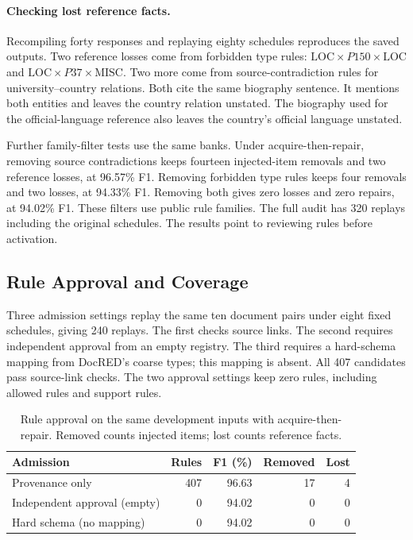 \paragraph{Checking lost reference facts.}

Recompiling forty responses and replaying eighty schedules reproduces
the saved outputs. Two reference losses come from forbidden type rules:
$\mathrm{LOC}\!\times\!P150\!\times\!\mathrm{LOC}$ and
$\mathrm{LOC}\!\times\!P37\!\times\!\mathrm{MISC}$.
Two more come from source-contradiction rules for university--country
relations. Both cite the same biography sentence. It mentions both
entities and leaves the country relation unstated.
The biography used for the official-language reference also leaves
the country's official language unstated.

Further family-filter tests use the same banks. Under acquire-then-repair,
removing source contradictions keeps fourteen injected-item removals
and two reference losses, at 96.57\% F1. Removing forbidden type rules
keeps four removals and two losses, at 94.33\% F1. Removing both gives
zero losses and zero repairs, at 94.02\% F1. These filters use public
rule families. The full audit has 320 replays including the original
schedules. The results point to reviewing rules before activation.

\subsection{Rule Approval and Coverage}

\label{app:rule_admission}

Three admission settings replay the same ten document pairs under eight
fixed schedules, giving 240 replays. The first checks source links.
The second requires independent approval from an empty registry.
The third requires a hard-schema mapping from DocRED's coarse types;
this mapping is absent. All 407 candidates pass source-link checks.
The two approval settings keep zero rules, including allowed rules
and support rules.

\begin{table}[t]
\centering
\caption{Rule approval on the same development inputs with acquire-then-repair. Removed counts injected items; lost counts reference facts.}
\label{tab:rule_admission_coverage}
\footnotesize
\setlength{\tabcolsep}{3pt}
\begin{tabular}{lrrrr}
\toprule
Admission & Rules & F1 (\%) & Removed & Lost \\
\midrule
Provenance only & 407 & 96.63 & 17 & 4 \\
Independent approval (empty) & 0 & 94.02 & 0 & 0 \\
Hard schema (no mapping) & 0 & 94.02 & 0 & 0 \\
\bottomrule
\end{tabular}
\end{table}


